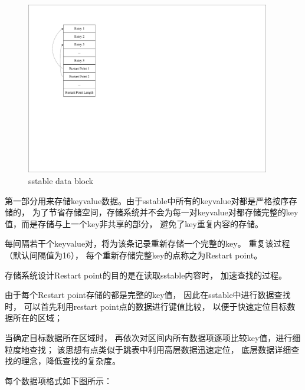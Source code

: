 \begin{enumerate}
\begin{enumerate}
					\begin{figure}[H]
						\centering
						\includegraphics[width=0.95\textwidth]{pdf/datablock.pdf}
						\caption{sstable data block}
						\label{sstable_data_block}
					\end{figure}
					
					第一部分用来存储keyvalue数据。由于sstable中所有的keyvalue对都是严格按序存储的，
					为了节省存储空间，存储系统并不会为每一对keyvalue对都存储完整的key值，而是存储与上一个key非共享的部分，
					避免了key重复内容的存储。
	
					每间隔若干个keyvalue对，将为该条记录重新存储一个完整的key。
					重复该过程（默认间隔值为16），
					每个重新存储完整key的点称之为Restart point。
	
					存储系统设计Restart point的目的是在读取sstable内容时，
					加速查找的过程。
	
					由于每个Restart point存储的都是完整的key值，
					因此在sstable中进行数据查找时，
					可以首先利用restart point点的数据进行键值比较，
					以便于快速定位目标数据所在的区域；
	
					当确定目标数据所在区域时，
					再依次对区间内所有数据项逐项比较key值，进行细粒度地查找；
					该思想有点类似于跳表中利用高层数据迅速定位，
					底层数据详细查找的理念，降低查找的复杂度。
	
					
					每个数据项格式如下图所示：
	

\end{enumerate}
\end{enumerate}
